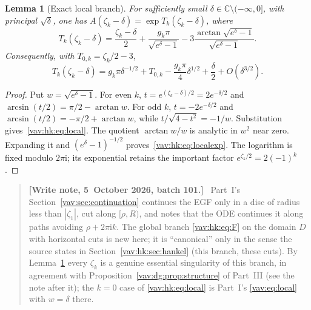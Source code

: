 \documentclass[11pt]{article}
\newtheorem{lemma}[theorem]{Lemma}
\theoremstyle{remark}\newtheorem{remark}[theorem]{Remark}
\newcommand{\ii}{\mathrm i}
\newenvironment{writenoteb}{\begin{quote}\small\raggedright\textbf{[Write note, 5~October 2026, batch 101.]}\ }{\end{quote}}
\newcommand{\C}{\mathbb C}
\begin{document}
\begin{lemma}[Exact local branch]\label{vav:hk:lem:local}
For sufficiently small $\delta\in\C\setminus(-\infty,0]$, with principal $\sqrt\delta$, one has $A(\zeta_k-\delta)=\exp T_k(\zeta_k-\delta)$, where
\begin{equation}\label{vav:hk:eq:local}
 T_k(\zeta_k-\delta)=\frac{\zeta_k-\delta}{2}
 +\frac{g_k\pi}{\sqrt{e^\delta-1}}
 -3\frac{\arctan\sqrt{e^\delta-1}}{\sqrt{e^\delta-1}}.
\end{equation}
Consequently, with $T_{0,k}=\zeta_k/2-3$,
\begin{equation}\label{vav:hk:eq:localexp}
 T_k(\zeta_k-\delta)
 =g_k\pi\delta^{-1/2}+T_{0,k}
 -\frac{g_k\pi}{4}\delta^{1/2}+\frac\delta2
 +O(\delta^{3/2}).
\end{equation}
\end{lemma}
\begin{proof}
Put $w=\sqrt{e^\delta-1}$. For even $k$, $t=e^{(\zeta_k-\delta)/2}=2e^{-\delta/2}$ and $\arcsin(t/2)=\pi/2-\arctan w$. For odd $k$, $t=-2e^{-\delta/2}$ and $\arcsin(t/2)=-\pi/2+\arctan w$, while $t/\sqrt{4-t^2}=-1/w$. Substitution gives~\eqref{vav:hk:eq:local}. The quotient $\arctan w/w$ is analytic in $w^2$ near zero. Expanding it and $(e^\delta-1)^{-1/2}$ proves~\eqref{vav:hk:eq:localexp}. The logarithm is fixed modulo $2\pi\ii$; its exponential retains the important factor $e^{\zeta_k/2}=2(-1)^k$.
\end{proof}
\begin{writenoteb}
Part~I's Section~\ref{vav:sec:continuation} continues the EGF only in a
disc of radius less than $|\zeta_1|$, cut along $[\rho,R)$, and notes that
the ODE continues it along paths avoiding $\rho+2\pi\ii k$. The global
branch \eqref{vav:hk:eq:F} on the domain $D$ with horizontal cuts is new
here; it is ``canonical'' only in the sense the source states in
Section~\ref{vav:hk:sec:hankel} (this branch, these cuts). By
Lemma~\ref{vav:hk:lem:local} every $\zeta_k$ is a genuine essential
singularity of this branch, in agreement with
Proposition~\ref{vav:dg:prop:structure} of Part~III (see the note after
it); the $k=0$ case of \eqref{vav:hk:eq:local} is Part~I's
\eqref{vav:eq:local} with $w=\delta$ there.
\end{writenoteb}
\end{document}

